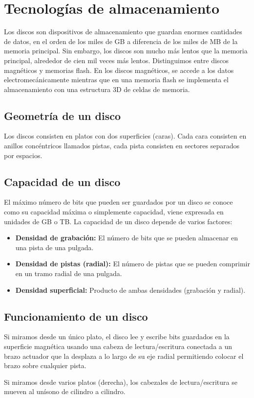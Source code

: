 \section{Tecnologías de almacenamiento}
Los discos son dispositivos de almacenamiento que guardan enormes cantidades de datos, en el orden de los miles de GB a diferencia de los miles de MB de la memoria principal.
Sin embargo, los discos son mucho más lentos que la memoria principal, alrededor de cien mil veces más lentos. Distinguimos entre discos magnéticos y memorias flash.
En los discos magnéticos, se accede a los datos electromecánicamente mientras que en una memoria flash se implementa el almacenamiento con una estructura 3D de celdas de memoria.
\subsection{Geometría de un disco}
Los discos consisten en platos con dos superficies (caras). Cada cara consisten en anillos concéntricos llamados pistas, cada pista consisten en sectores separados por espacios.
\begin{center}
    
\end{center}
\subsection{Capacidad de un disco}
El máximo número de bits que pueden ser guardados por un disco se conoce como su capacidad máxima
o simplemente capacidad, viene expresada en unidades de GB o TB. La capacidad de un disco depende de varios factores:
\begin{itemize}
    \item \textbf{Densidad de grabación:} El número de bits que se pueden almacenar en una pista de una pulgada.
    \item \textbf{Densidad de pistas (radial):} El número de pistas que se pueden comprimir en un tramo radial de una pulgada.
    \item \textbf{Densidad superficial:} Producto de ambas densidades (grabación y radial).
\end{itemize}
\subsection{Funcionamiento de un disco}
Si miramos desde un único plato, el disco lee y escribe bits guardados en la superficie magnética usando una cabeza de lectura/escritura conectada a un brazo actuador que la desplaza a lo largo de su eje radial permitiendo
colocar el brazo sobre cualquier pista.
\begin{center}
    
    
\end{center}
Si miramos desde varios platos (derecha), los cabezales de lectura/escritura se mueven al unísono de cilindro a cilindro.
